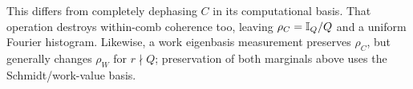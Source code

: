 This differs from completely dephasing \(C\) in its computational basis. That operation destroys within-comb coherence too, leaving \(\rho_C=\mathbb I_Q/Q\) and a uniform Fourier histogram. Likewise, a work eigenbasis measurement preserves \(\rho_C\), but generally changes \(\rho_W\) for \(r\nmid Q\); preservation of both marginals above uses the Schmidt/work-value basis.

